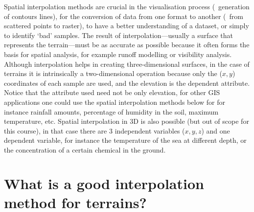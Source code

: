 Spatial interpolation methods are crucial in the visualisation process (\eg\ generation of contours lines), for the conversion of data from one format to another (\eg\ from scattered points to raster), to have a better understanding of a dataset, or simply to identify `bad' samples. 
The result of interpolation---usually a surface that represents the terrain---must be as accurate as possible because it often forms the basis for spatial analysis, for example runoff modelling or visibility analysis. 
Although interpolation helps in creating three-dimensional surfaces, in the case of terrains it is intrinsically a two-dimensional operation because only the ($x,y$) coordinates of each sample are used, and the elevation is the dependent attribute.
Notice that the attribute used need not be only elevation, for other GIS applications one could use the spatial interpolation methods below for for instance rainfall amounts, percentage of humidity in the soil, maximum temperature, etc. 
Spatial interpolation in 3D is also possible (but out of scope for this course), in that case there are 3 independent variables ($x,y,z$) and one dependent variable, for instance the temperature of the sea at different depth, or the concentration of a certain chemical in the ground.


%


\section{What is a good interpolation method for terrains?}

